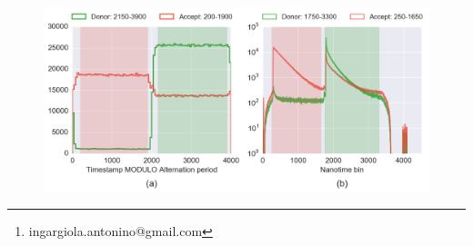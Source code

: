 
\title{}
\author{Antonino Ingargiola\thanks{ingargiola.antonino@gmail.com} \and Eitan Lerner  
\and SangYoon Chung \and Shimon Weiss \and Xavier Michalet}


\verbatimfont{\small}
\lstset{language=Python}

\maketitle

\begin{abstract}

\end{abstract}

\tableofcontents







\begin{figure}
\begin{center}
\includegraphics[width=\doublefig]{"figures/ALEX_alternation_double/ALEX_alternation_double"}
\caption[]{}
\end{center}
\end{figure}






